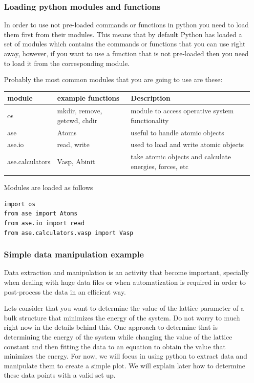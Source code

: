 \documentclass[11pt]{article}
\begin{document}
\subsubsection{Loading python modules and functions}
\label{sec-2-2-3}
In order to use not pre-loaded commands or functions in python you need to load them first from their modules. This means that by default Python has loaded a set of modules which contains the commands or functions that you can use right away, however, if you want to use a function that is not pre-loaded then you need to load it from the corresponding module. 

Probably the most common modules that you are going to use are these:
\begin{center}
\begin{tabular}{lll}
module & example functions & Description\\
\hline
os & mkdir, remove, getcwd, chdir & module to access operative system functionality\\
ase & Atoms & useful to handle atomic objects\\
ase.io & read, write & used to load and write atomic objects\\
ase.calculators & Vasp, Abinit & take atomic objects and calculate energies, forces, etc\\
 &  & \\
\end{tabular}
\end{center}

Modules are loaded as follows
\begin{verbatim}
import os
from ase import Atoms
from ase.io import read
from ase.calculators.vasp import Vasp
\end{verbatim}

\subsubsection{Simple data manipulation example}
\label{sec-2-2-4}
Data extraction and manipulation is an activity that become important, specially when dealing with huge data files or when automatization is required in order to post-process the data in an efficient way.

Lets consider that you want to determine the value of the lattice parameter of a bulk structure that minimizes the energy of the system. Do not worry to much right now in the details behind this. One approach to determine that is determining the energy of the system while changing the value of the lattice constant and then fitting the data to an equation to obtain the value that minimizes the energy. For now, we will focus in using python to extract data and manipulate them to create a simple plot. We will explain later how to determine these data points with a valid set up.
\end{document}
